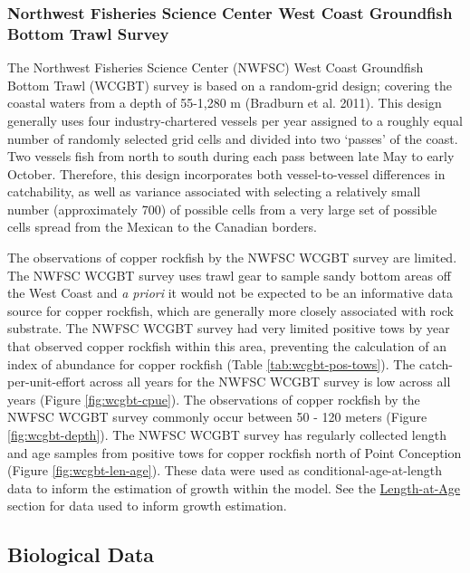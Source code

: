 \documentclass[11pt,
  english,
  letterpaper,
]{article}
\begin{document}
\hypertarget{northwest-fisheries-science-center-west-coast-groundfish-bottom-trawl-survey}{%
\subsubsection{Northwest Fisheries Science Center West Coast Groundfish Bottom Trawl Survey}\label{northwest-fisheries-science-center-west-coast-groundfish-bottom-trawl-survey}}

The Northwest Fisheries Science Center (NWFSC) West Coast Groundfish Bottom Trawl (WCGBT) survey is based on a random-grid design; covering the coastal waters from a depth of 55-1,280 m (Bradburn et al. 2011). This design generally uses four industry-chartered vessels per year assigned to a roughly equal number of randomly selected grid cells and divided into two `passes' of the coast. Two vessels fish from north to south during each pass between late May to early October. Therefore, this design incorporates both vessel-to-vessel differences in catchability, as well as variance associated with selecting a relatively small number (approximately 700) of possible cells from a very large set of possible cells spread from the Mexican to the Canadian borders.

The observations of copper rockfish by the NWFSC WCGBT survey are limited. The NWFSC WCGBT survey uses trawl gear to sample sandy bottom areas off the West Coast and \emph{a priori} it would not be expected to be an informative data source for copper rockfish, which are generally more closely associated with rock substrate. The NWFSC WCGBT survey had very limited positive tows by year that observed copper rockfish within this area, preventing the calculation of an index of abundance for copper rockfish (Table \ref{tab:wcgbt-pos-tows}). The catch-per-unit-effort across all years for the NWFSC WCGBT survey is low across all years (Figure \ref{fig:wcgbt-cpue}). The observations of copper rockfish by the NWFSC WCGBT survey commonly occur between 50 - 120 meters (Figure \ref{fig:wcgbt-depth}). The NWFSC WCGBT survey has regularly collected length and age samples from positive tows for copper rockfish north of Point Conception (Figure \ref{fig:wcgbt-len-age}). These data were used as conditional-age-at-length data to inform the estimation of growth within the model. See the \protect\hyperlink{length-at-age}{Length-at-Age} section for data used to inform growth estimation.

\hypertarget{biological-data}{%
\subsection{Biological Data}\label{biological-data}}
\end{document}
